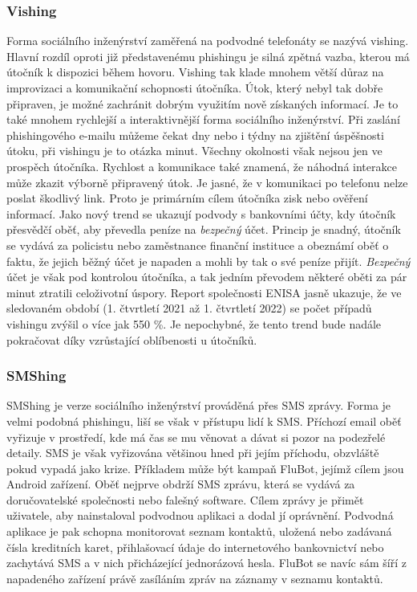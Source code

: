 \subsubsection{Vishing}
Forma sociálního inženýrství zaměřená na podvodné telefonáty se nazývá vishing.
Hlavní rozdíl oproti již představenému phishingu je silná zpětná vazba, kterou má útočník k dispozici během hovoru.
Vishing tak klade mnohem větší důraz na improvizaci a komunikační schopnosti útočníka.
Útok, který nebyl tak dobře připraven, je možné zachránit dobrým využitím nově získaných informací.
Je to také mnohem rychlejší a interaktivnější forma sociálního inženýrství.
Při zaslání phishingového e-mailu můžeme čekat dny nebo i týdny na zjištění úspěšnosti útoku, při vishingu je to otázka minut.
Všechny okolnosti však nejsou jen ve prospěch útočníka.
Rychlost a komunikace také znamená, že náhodná interakce může zkazit výborně připravený útok.
Je jasné, že v komunikaci po telefonu nelze poslat škodlivý link.
Proto je primárním cílem útočníka zisk nebo ověření informací.
Jako nový trend se ukazují podvody s bankovními účty, kdy útočník přesvědčí oběť, aby převedla peníze na \textit{bezpečný} účet.
Princip je snadný, útočník se vydává za policistu nebo zaměstnance finanční instituce a obeznámí oběť o faktu, že jejich běžný účet je napaden a mohli by tak o své peníze přijít.
\textit{Bezpečný} účet je však pod kontrolou útočníka, a tak jedním převodem některé oběti za pár minut ztratili celoživotní úspory.
Report společnosti \ac{ENISA} jasně ukazuje, že ve sledovaném období (1. čtvrtletí 2021 až 1. čtvrtletí 2022) se počet případů vishingu zvýšil o více jak 550 \%.
Je nepochybné, že tento trend bude nadále pokračovat díky vzrůstající oblíbenosti u útočníků.\cite{Enisa_thread_landscape, moje_bakalarka}

\subsubsection{SMShing}
SMShing je verze sociálního inženýrství prováděná přes \ac{SMS} zprávy.
Forma je velmi podobná phishingu, liší se však v přístupu lidí k \ac{SMS}.
Příchozí email oběť vyřizuje v prostředí, kde má čas se mu věnovat a dávat si pozor na podezřelé detaily.
\ac{SMS} je však vyřizována většinou hned při jejím příchodu, obzvláště pokud vypadá jako krize.
Příkladem může být kampaň FluBot, jejímž cílem jsou Android zařízení.
Oběť nejprve obdrží \ac{SMS} zprávu, která se vydává za doručovatelské společnosti nebo falešný software.
Cílem zprávy je přimět uživatele, aby nainstaloval podvodnou aplikaci a dodal jí oprávnění.
Podvodná aplikace je pak schopna monitorovat seznam kontaktů, uložená nebo zadávaná čísla kreditních karet, přihlašovací údaje do internetového bankovnictví nebo zachytává \ac{SMS} a v nich přicházející jednorázová hesla.
FluBot se navíc sám šíří z napadeného zařízení právě zasíláním zpráv na záznamy v seznamu kontaktů.\cite{Enisa_thread_landscape, moje_bakalarka}

